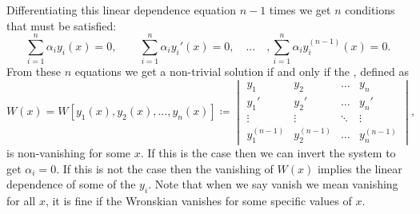 \documentclass[fleqn]{NotesClass}
\begin{document}
    Differentiating this linear dependence equation \(n - 1\) times we get \(n\) conditions that must be satisfied:
    \begin{equation}
        \sum_{i=1}^{n} \alpha_i y_i(x) = 0, \qquad \sum_{i=1}^n \alpha_i y_i'(x) = 0, \quad\dotsc\quad, \sum_{i=1}^{n} \alpha_iy_i^{(n-1)}(x) = 0.
    \end{equation}
    From these \(n\) equations we get a non-trivial solution if and only if the , defined as
    \begin{equation}
        W(x) = W[y_1(x), y_2(x), \dotsc, y_n(x)] \coloneqq
        \begin{vmatrix}
            y_1 & y_2 & \dots & y_n\\
            y_1' & y_2' & \dots & y_n'\\
            \vdots & \vdots & \ddots & \vdots\\
            y_1^{(n-1)} & y_2^{(n - 1)} & \dots & y_n^{(n-1)}
        \end{vmatrix}
        ,
    \end{equation}
    is non-vanishing for some \(x\).
    If this is the case then we can invert the system to get \(\alpha_i = 0\).
    If this is not the case then the vanishing of \(W(x)\) implies the linear dependence of some of the \(y_i\).
    Note that when we say vanish we mean vanishing for all \(x\), it is fine if the Wronskian vanishes for some specific values of \(x\).
    
\end{document}
